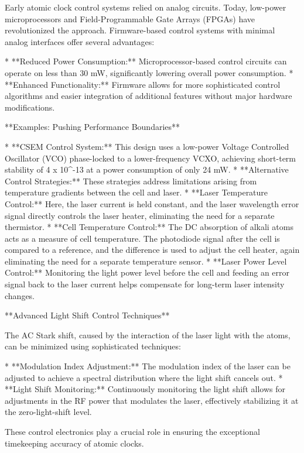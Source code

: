Early atomic clock control systems relied on analog circuits. Today, low-power microprocessors and Field-Programmable Gate Arrays (FPGAs) have revolutionized the approach. Firmware-based control systems with minimal analog interfaces offer several advantages:

* **Reduced Power Consumption:** Microprocessor-based control circuits can operate on less than 30 mW, significantly lowering overall power consumption.
* **Enhanced Functionality:** Firmware allows for more sophisticated control algorithms and easier integration of additional features without major hardware modifications.

**Examples: Pushing Performance Boundaries**

* **CSEM Control System:** This design uses a low-power Voltage Controlled Oscillator (VCO) phase-locked to a lower-frequency VCXO, achieving short-term stability of 4 x 10^-13 at a power consumption of only 24 mW.
* **Alternative Control Strategies:**  These strategies address limitations arising from temperature gradients between the cell and laser.
* **Laser Temperature Control:** Here, the laser current is held constant, and the laser wavelength error signal directly controls the laser heater, eliminating the need for a separate thermistor.
* **Cell Temperature Control:** The DC absorption of alkali atoms acts as a measure of cell temperature. The photodiode signal after the cell is compared to a reference, and the difference is used to adjust the cell heater, again eliminating the need for a separate temperature sensor.
* **Laser Power Level Control:** Monitoring the light power level before the cell and feeding an error signal back to the laser current helps compensate for long-term laser intensity changes.

**Advanced Light Shift Control Techniques**

The AC Stark shift, caused by the interaction of the laser light with the atoms, can be minimized using sophisticated techniques:

* **Modulation Index Adjustment:** The modulation index of the laser can be adjusted to achieve a spectral distribution where the light shift cancels out.
* **Light Shift Monitoring:**  Continuously monitoring the light shift allows for adjustments in the RF power that modulates the laser, effectively stabilizing it at the zero-light-shift level.

These control electronics play a crucial role in ensuring the exceptional timekeeping accuracy of atomic clocks.



